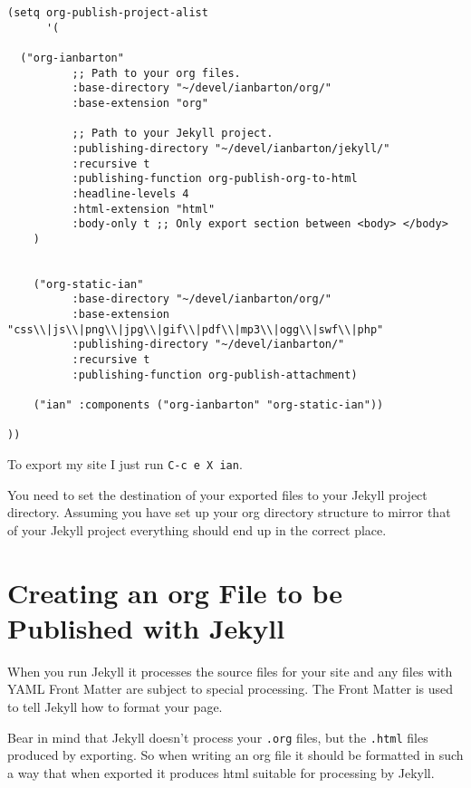 \documentclass{article}
\begin{document}
\begin{verbatim}
(setq org-publish-project-alist
      '(

  ("org-ianbarton"
          ;; Path to your org files.
          :base-directory "~/devel/ianbarton/org/"
          :base-extension "org"

          ;; Path to your Jekyll project.
          :publishing-directory "~/devel/ianbarton/jekyll/"
          :recursive t
          :publishing-function org-publish-org-to-html
          :headline-levels 4
          :html-extension "html"
          :body-only t ;; Only export section between <body> </body>
    )


    ("org-static-ian"
          :base-directory "~/devel/ianbarton/org/"
          :base-extension "css\\|js\\|png\\|jpg\\|gif\\|pdf\\|mp3\\|ogg\\|swf\\|php"
          :publishing-directory "~/devel/ianbarton/"
          :recursive t
          :publishing-function org-publish-attachment)

    ("ian" :components ("org-ianbarton" "org-static-ian"))

))
\end{verbatim}

To export my site I just run \texttt{C-c e X ian}.

You need to set the destination of your exported files to your Jekyll
project directory. Assuming you have set up your org directory structure
to mirror that of your Jekyll project everything should end up in the
correct place.
\section{Creating an org File to be Published with Jekyll}
\label{sec-5}


When you run Jekyll it processes the source files for your site and any
files with YAML Front Matter are subject to special processing. The
Front Matter is used to tell Jekyll how to format your page.

Bear in mind that Jekyll doesn't process your \texttt{.org} files, but the
\texttt{.html} files produced by exporting. So when writing an org file it
should be formatted in such a way that when exported it produces html
suitable for processing by Jekyll.
\end{document}
